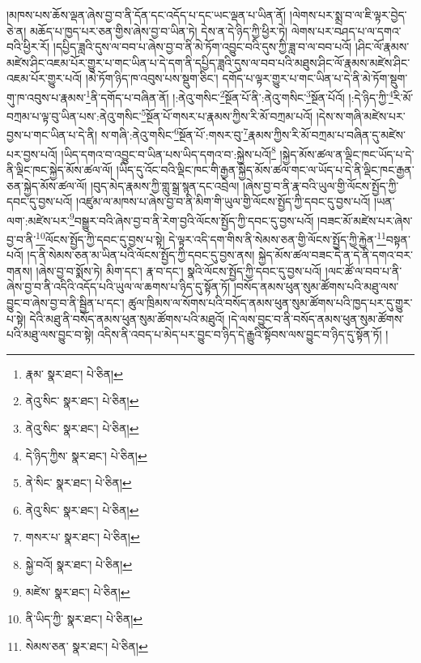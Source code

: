 །མཁས་པས་ཆོས་ལྡན་ཞེས་བྱ་བ་ནི་དོན་དང་འདོད་པ་དང་ཡང་ལྡན་པ་ཡིན་ནོ། །ལེགས་པར་སྨྲ་བ་ལ་ཇི་ལྟར་བྱེད་ཅེ་ན། མཆོད་པ་ཁྱད་པར་ཅན་གྱིས་ཞེས་བྱ་བ་ཡིན་ཏེ། དེས་ན་དེ་ཉིད་ཀྱི་ཕྱིར་ཏེ། ལེགས་པར་བཤད་པ་ལ་དགའ་བའི་ཕྱིར་རོ། །དཔྱིད་ཟླའི་དུས་ལ་བབ་པ་ཞེས་བྱ་བ་ནི་མེ་ཏོག་འབྱུང་བའི་དུས་ཀྱི་ཟླ་བ་ལ་བབ་པའོ། །ཤིང་ལོ་རྣམས་མཛེས་ཤིང་འཇམ་པོར་གྱུར་པ་གང་ཡིན་པ་དེ་དག་ནི་དཔྱིད་ཟླའི་དུས་ལ་བབ་པའི་མཐུས་ཤིང་ལོ་རྣམས་མཛེས་ཤིང་འཇམ་པོར་གྱུར་པའོ། །མེ་ཏོག་ཉིད་ཁ་འབུས་པས་སྡུག་ཅིང་། དགོད་པ་ལྟར་གྱུར་པ་གང་ཡིན་པ་དེ་ནི་མེ་ཏོག་སྡུག་གུ་ཁ་འབུས་པ་རྣམས་\footnote{རྣམ་  སྣར་ཐང་།  པེ་ཅིན། }ནི་དགོད་པ་བཞིན་ནོ། །:ནེའུ་གསིང་\footnote{ནེའུ་སིང་  སྣར་ཐང་།  པེ་ཅིན། }སྔོན་པོ་ནི་:ནེའུ་གསིང་\footnote{ནེའུ་སིང་  སྣར་ཐང་།  པེ་ཅིན། }སྔོན་པོའོ། །:དེ་ཉིད་ཀྱི་\footnote{དེ་ཉིད་ཀྱིས་  སྣར་ཐང་།  པེ་ཅིན། }རི་མོ་བཀྲམ་པ་ལྟ་བུ་ཡིན་པས་:ནེའུ་གསིང་\footnote{ནེ་སིང་  སྣར་ཐང་།  པེ་ཅིན། }སྔོན་པོ་གསར་པ་རྣམས་ཀྱིས་རི་མོ་བཀྲམ་པའོ། །དེས་ས་གཞི་མཛེས་པར་བྱས་པ་གང་ཡིན་པ་དེ་ནི། ས་གཞི་:ནེའུ་གསིང་\footnote{ནེའུ་སིང་  སྣར་ཐང་།  པེ་ཅིན། }སྔོན་པོ་:གསར་བུ་\footnote{གསར་པ་  སྣར་ཐང་།  པེ་ཅིན། }རྣམས་ཀྱིས་རི་མོ་བཀྲམ་པ་བཞིན་དུ་མཛེས་པར་བྱས་པའོ། །ཡིད་དགའ་བ་འབྱུང་བ་ཡིན་པས་ཡིད་དགའ་བ་:སྐྱེས་པའོ།\footnote{སྐྱེ་བའོ།  སྣར་ཐང་།  པེ་ཅིན། } །སྐྱེད་མོས་ཚལ་ན་ལྡིང་ཁང་ཡོད་པ་དེ་ནི་ལྡིང་ཁང་སྐྱེད་མོས་ཚལ་ལོ། །ཡིད་དུ་འོང་བའི་ལྡིང་ཁང་གི་རྒྱན་སྐྱེད་མོས་ཚལ་གང་ལ་ཡོད་པ་དེ་ནི་ལྡིང་ཁང་རྒྱན་ཅན་སྐྱེད་མོས་ཚལ་ལོ། །བུད་མེད་རྣམས་ཀྱི་གླུ་སྒྲ་སྙན་དང་འབྲེལ། །ཞེས་བྱ་བ་ནི་རྣ་བའི་ཡུལ་གྱི་ལོངས་སྤྱོད་ཀྱི་དབང་དུ་བྱས་པའོ། །འཛུམ་ལ་མཁས་པ་ཞེས་བྱ་བ་ནི་མིག་གི་ཡུལ་གྱི་ལོངས་སྤྱོད་ཀྱི་དབང་དུ་བྱས་པའོ། །ཡན་ལག་:མཛེས་པར་\footnote{མཛེས་  སྣར་ཐང་།  པེ་ཅིན། }བསྒྱུར་བའི་ཞེས་བྱ་བ་ནི་རེག་བྱའི་ལོངས་སྤྱོད་ཀྱི་དབང་དུ་བྱས་པའོ། །བཟང་མོ་མཛེས་པར་ཞེས་བྱ་བ་ནི་\footnote{ནི་ཡིད་ཀྱི་  སྣར་ཐང་།  པེ་ཅིན། }ལོངས་སྤྱོད་ཀྱི་དབང་དུ་བྱས་པ་སྟེ། དེ་ལྟར་འདི་དག་གིས་ནི་སེམས་ཅན་གྱི་ལོངས་སྤྱོད་ཀྱི་རྐྱེན་\footnote{སེམས་ཅན་  སྣར་ཐང་།  པེ་ཅིན། }བསྟན་པའོ། །ད་ནི་སེམས་ཅན་མ་ཡིན་པའི་ལོངས་སྤྱོད་ཀྱི་དབང་དུ་བྱས་ནས། སྐྱེད་མོས་ཚལ་བཟང་དེ་ན་དེ་ནི་དགའ་བར་གནས། །ཞེས་བྱ་བ་སྨོས་ཏེ། མིག་དང་། རྣ་བ་དང་། སྣའི་ལོངས་སྤྱོད་ཀྱི་དབང་དུ་བྱས་པའོ། །ལང་ཚོ་ལ་བབ་པ་ནི་ཞེས་བྱ་བ་ནི་འདིའི་འདོད་པའི་ཡུལ་ལ་ཆགས་པ་ཉིད་དུ་སྟོན་ཏོ། །བསོད་ནམས་ཕུན་སུམ་ཚོགས་པའི་མཐུ་ལས་བྱུང་བ་ཞེས་བྱ་བ་ནི་སྦྱིན་པ་དང་། ཚུལ་ཁྲིམས་ལ་སོགས་པའི་བསོད་ནམས་ཕུན་སུམ་ཚོགས་པའི་ཁྱད་པར་དུ་གྱུར་པ་སྟེ། དེའི་མཐུ་ནི་བསོད་ནམས་ཕུན་སུམ་ཚོགས་པའི་མཐུའོ། །དེ་ལས་བྱུང་བ་ནི་བསོད་ནམས་ཕུན་སུམ་ཚོགས་པའི་མཐུ་ལས་བྱུང་བ་སྟེ། འདིས་ནི་འབད་པ་མེད་པར་བྱུང་བ་ཉིད་དེ་རྒྱུའི་སྟོབས་ལས་བྱུང་བ་ཉིད་དུ་སྟོན་ཏོ། །
